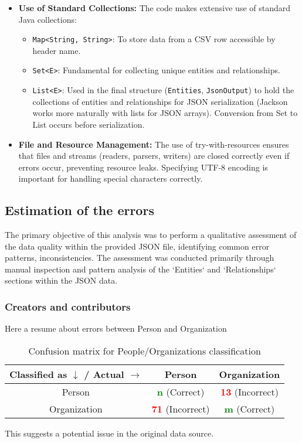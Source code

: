 \begin{itemize}
    \item \textbf{Use of Standard Collections:} The code makes extensive use of standard Java collections:
        \begin{itemize}
            \item \texttt{Map<String, String>}: To store data from a CSV row accessible by header name.
            \item \texttt{Set<E>}: Fundamental for collecting unique entities and relationships.
            \item \texttt{List<E>}: Used in the final structure (\texttt{Entities}, \texttt{JsonOutput}) to hold the collections of entities and relationships for JSON serialization (Jackson works more naturally with lists for JSON arrays). Conversion from Set to List occurs before serialization.
        \end{itemize}

    \item \textbf{File and Resource Management:} The use of try-with-resources ensures that files and streams (readers, parsers, writers) are closed correctly even if errors occur, preventing resource leaks. Specifying UTF-8 encoding is important for handling special characters correctly.
\end{itemize}

\subsection{Estimation of the errors}
The primary objective of this analysis was to perform a qualitative assessment of the data quality within the provided JSON file, identifying common error patterns, inconsistencies.
\newline
The assessment was conducted primarily through manual inspection and pattern analysis of the `Entities` and `Relationships` sections within the JSON data.

\subsubsection{Creators and contributors}
Here a resume about errors between Person and Organization
\begin{table}[h]
    \centering
    \begin{tabular}{|c|c|c|}
        \hline
        Classified as $\downarrow$ / Actual $\rightarrow$ & Person & Organization \\
        \hline
        Person &  \textcolor{green}{\textbf{n}} (Correct) & \textcolor{red}{\textbf{13}} (Incorrect) \\
        \hline
        Organization & \textcolor{red}{\textbf{71}} (Incorrect) &  \textcolor{green}{\textbf{m}} (Correct) \\
        \hline
    \end{tabular}
    \caption{Confusion matrix for People/Organizations classification}
    \label{tab:people_org}
\end{table}
\newline
This suggests a potential issue in the original data source.




